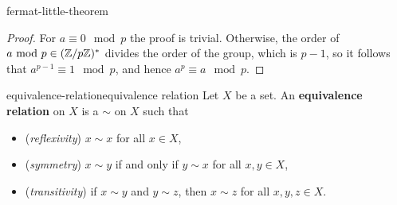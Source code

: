 \begin{example}{fermat-little-theorem}
    \begin{proof}
        For $a \equiv 0 \mod p$ the proof is trivial. Otherwise, the order of $a \textup{ mod } p \in (\mathbb{Z}/p\mathbb{Z})^*$ divides the order of the group, which is $p - 1$, so it follows that $a^{p - 1} \equiv 1 \mod p$, and hence $a^p \equiv a \mod p$.
    \end{proof}
\end{example}

\begin{topic}{equivalence-relation}{equivalence relation}
    Let $X$ be a set. An \textbf{equivalence relation} on $X$ is a  $\sim$ on $X$ such that
    \begin{itemize}
        \item (\textit{reflexivity}) $x \sim x$ for all $x \in X$,
        \item (\textit{symmetry}) $x \sim y$ if and only if $y \sim x$ for all $x, y \in X$,
        \item (\textit{transitivity}) if $x \sim y$ and $y \sim z$, then $x \sim z$ for all $x, y, z \in X$.
    \end{itemize}
\end{topic}
